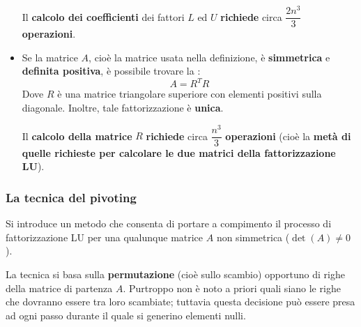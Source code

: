 \begin{itemize}
    Il \textbf{calcolo dei coefficienti} dei fattori $L$ ed $U$ \textbf{richiede} circa $\dfrac{2n^{3}}{3}$ \textbf{operazioni}.
    

    \item Se la matrice $A$, cioè la matrice usata nella definizione, è \textbf{simmetrica} e \textbf{definita positiva}, è possibile trovare la :
    \begin{equation}\label{eq: fattorizzazione di Cholesky}
        A = R^{T}R
    \end{equation}
    Dove $R$ è una matrice triangolare superiore con elementi positivi sulla diagonale. Inoltre, tale fattorizzazione è \textbf{unica}.

    Il \textbf{calcolo della matrice} $R$ \textbf{richiede} circa $\dfrac{n^{3}}{3}$ \textbf{operazioni} (cioè la \textbf{metà di quelle richieste per calcolare le due matrici della fattorizzazione LU}).
\end{itemize}

\longline

\subsubsection{La tecnica del pivoting}

Si introduce un metodo che consenta di portare a compimento il processo di fattorizzazione LU per una qualunque matrice $A$ non simmetrica ($\det(A) \ne 0$). 

\highspace
La tecnica si basa sulla \textbf{permutazione} (cioè sullo scambio) opportuno di righe della matrice di partenza $A$. Purtroppo non è noto a priori quali siano le righe che dovranno essere tra loro scambiate; tuttavia questa decisione può essere presa ad ogni passo durante il quale si generino elementi nulli.

